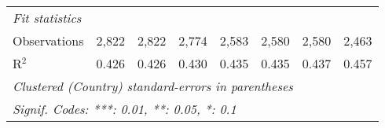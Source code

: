 \begin{tabular}{lccccccc}
   \midrule \emph{Fit statistics}\\
   Observations                                                                 & 2,822         & 2,822         & 2,774         & 2,583         & 2,580         & 2,580         & 2,463\\  
   R$^2$                                                                        & 0.426         & 0.426         & 0.430         & 0.435         & 0.435         & 0.437         & 0.457\\  
   \midrule
   \multicolumn{8}{l}{\emph{Clustered (Country) standard-errors in parentheses}}\\
   \multicolumn{8}{l}{\emph{Signif. Codes: ***: 0.01, **: 0.05, *: 0.1}}\\
\end{tabular}
\par\endgroup


